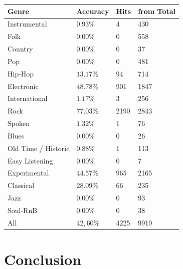 \begin{center}
	\begin{tabular}{ p{} p{} p{} p{}}
		Genre & Accuracy & Hits & from Total\\
		\hline
		Instrumental & $0.93\%$ & 4 & 430\\
		Folk & $0.00\%$ & 0 & 558\\
		Country & $0.00\%$ & 0 & 37\\
		Pop & $0.00\%$ & 0 & 481\\
		Hip-Hop & $13.17\%$ & 94 & 714\\
		Electronic & $48.78\%$ & 901 & 1847\\
		International & $1.17\%$ & 3 & 256\\
		Rock & $77.03\%$ & 2190 & 2843\\
		Spoken & $1.32\%$ & 1 & 76\\
		Blues & $0.00\%$ & 0 & 26\\
		Old Time / Historic & $0.88\%$ & 1 & 113\\
		Easy Listening & $0.00\%$ & 0 & 7\\
		Experimental & $44.57\%$ & 965 & 2165\\
		Classical & $28.09\%$ & 66 & 235\\
		Jazz & $0.00\%$ & 0 & 93\\
		Soul-RnB & $0.00\%$ & 0 & 38\\
		\hline
		All & $42,60\%$ & 4225 & 9919\\
	\end{tabular}
	\label{accperclasstuned}
\end{center}

\section{Conclusion}

